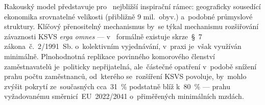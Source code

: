 Rakouský model představuje pro~ nejbližší inspirační rámec:
geograficky sousedící ekonomika srovnatelné velikosti (přibližně 9 mil.~obyv.)
a~podobné průmyslové struktury. Klíčový přenositelný mechanismus by~se týkal
mechanismu rozšiřování závaznosti \acs{KSVS} \emph{erga omnes} --- v~
formálně existuje skrze~\S~7 zákona~č.~2/1991~Sb. o~kolektivním vyjednávání,
v~praxi je~však využíván minimálně. Plnohodnotná replikace povinného
komorového členství zaměstnavatelů je~politicky nepřijatelná, ale~částečné
opatření v~podobě snížení prahu počtu zaměstnanců, od~kterého se~rozšíření
\acs{KSVS} povoluje, by~mohlo zvýšit pokrytí ze~současných cca~\SI{31}{\percent}
podstatně blíž k~\SI{80}{\percent} --- prahu vyžadovanému směrnicí~\acs{EU}~2022/2041
o~přiměřených minimálních mzdách.\par
